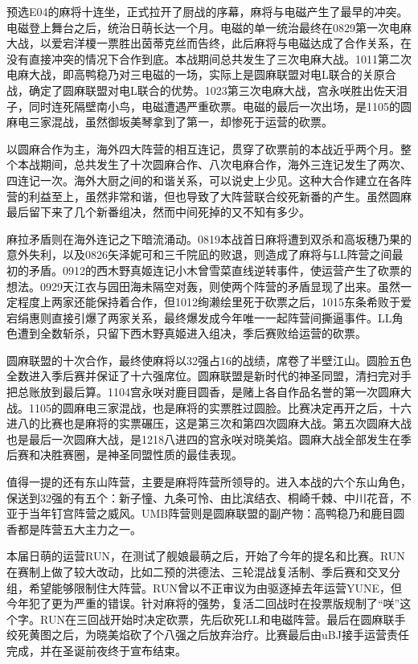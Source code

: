 预选E04的麻将十连坐，正式拉开了厨战的序幕，麻将与电磁产生了最早的冲突。电磁登上舞台之后，统治日萌长达一个月。电磁的单一统治最终在0829第一次电麻大战，以爱宕洋榎一票胜出茵蒂克丝而告终，此后麻将与电磁达成了合作关系，在没有直接冲突的情况下合作到底。本战期间总共发生了三次电麻大战。1011第二次电麻大战，即高鸭稳乃对三电磁的一场，实际上是圆麻联盟对电L联合的关原合战，确定了圆麻联盟对电L联合的优势。1023第三次电麻大战，宫永咲胜出佐天泪子，同时连死隔壁南小鸟，电磁遭遇严重砍票。电磁的最后一次出场，是1105的圆麻电三家混战，虽然御坂美琴拿到了第一，却惨死于运营的砍票。

以圆麻合作为主，海外四大阵营的相互连记，贯穿了砍票前的本战近乎两个月。整个本战期间，总共发生了十次圆麻合作、八次电麻合作，海外三连记发生了两次、四连记一次。海外大厨之间的和谐关系，可以说史上少见。这种大合作建立在各阵营的利益至上，虽然非常和谐，但也导致了大阵营联合绞死新番的产生。虽然圆麻最后留下来了几个新番组决，然而中间死掉的又不知有多少。

麻拉矛盾则在海外连记之下暗流涌动。0819本战首日麻将遭到双杀和高坂穗乃果的意外失利，以及0826矢泽妮可和三千院凪的败退，则造成了麻将与LL阵营之间最初的矛盾。0912的西木野真姬连记小木曾雪菜直线逆转事件，使运营产生了砍票的想法。0929天江衣与园田海未隔空对轰，则使两个阵营的矛盾显现了出来。虽然一定程度上两家还能保持着合作，但1012绚濑绘里死于砍票之后，1015东条希败于爱宕绢惠则直接引爆了两家关系，最终爆发成今年唯一一起阵营间撕逼事件。LL角色遭到全数斩杀，只留下西木野真姬进入组决，季后赛败给运营的砍票。

圆麻联盟的十次合作，最终使麻将以32强占16的战绩，席卷了半壁江山。圆脸五色全数进入季后赛并保证了十六强席位。圆麻联盟是新时代的神圣同盟，清扫完对手把总账放到最后算。1104宫永咲对鹿目圆香，是赌上各自作品名誉的第一次圆麻大战。1105的圆麻电三家混战，也是麻将的实票胜过圆脸。比赛决定再开之后，十六进八的比赛也是麻将的实票碾压，这是第三次和第四次圆麻大战。第五次圆麻大战也是最后一次圆麻大战，是1218八进四的宫永咲对晓美焰。圆麻大战全部发生在季后赛和决胜赛圈，是神圣同盟性质的最佳表现。

值得一提的还有东山阵营，主要是麻将阵营所领导的。进入本战的六个东山角色，保送到32强的有五个：新子憧、九条可怜、由比滨结衣、桐崎千棘、中川花音，不亚于当年钉宫阵营之威风。UMB阵营则是圆麻联盟的副产物：高鸭稳乃和鹿目圆香都是阵营五大主力之一。

本届日萌的运营RUN，在测试了舰娘最萌之后，开始了今年的提名和比赛。RUN在赛制上做了较大改动，比如二预的洪德法、三轮混战复活制、季后赛和交叉分组，希望能够限制住大阵营。RUN曾以不正审议为由驱逐掉去年运营YUNE，但今年犯了更为严重的错误。针对麻将的强势，复活二回战时在投票版规制了“咲”这个字。RUN在三回战开始时决定砍票，先后砍死LL和电磁阵营。最后在圆麻联手绞死黄图之后，为晓美焰砍了个八强之后放弃治疗。比赛最后由uBJ接手运营责任完成，并在圣诞前夜终于宣布结束。

